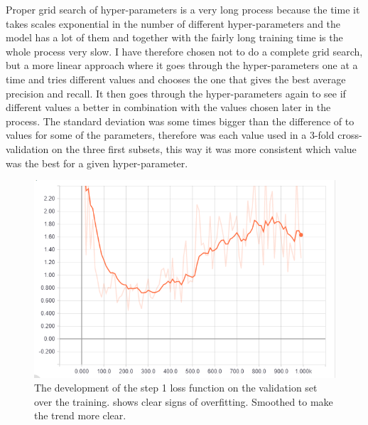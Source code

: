 Proper grid search of hyper-parameters is a very long process because the time it takes
scales exponential in the number of different hyper-parameters and the model has a lot 
of them and together with the fairly long training time is the whole process very slow.
I have therefore chosen not to do a complete grid search,
but a more linear approach where it goes through the hyper-parameters one at a time and
tries different values and chooses the one that gives the best average precision and recall.
It then goes through the hyper-parameters again to see if different values a better in 
combination with the values chosen later in the process.
The standard deviation was some times bigger than the difference of to values for some 
of the parameters, therefore was each value used in a 3-fold cross-validation on the 
three first subsets, this way it was more consistent which value was the best for a 
given hyper-parameter.

\begin{figure}
	\centering
	\includegraphics[width=\textwidth]{sections/experiments/overfitting}
	\caption{The development of the step 1 loss function on the validation set over the training.
	shows clear signs of overfitting. Smoothed to make the trend more clear.}
	\label{fig:overfitting}
\end{figure}

